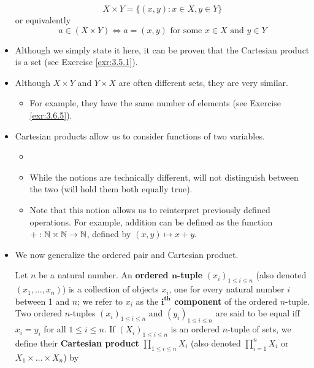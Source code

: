 \documentclass[../main.tex]{subfiles}
\begin{document}
\begin{itemize}
\begin{dfn}
\begin{equation*}
            X\times Y = \{(x,y):x\in X,y\in Y\}
        \end{equation*}
        or equivalently
        \begin{equation*}
            a\in(X\times Y) \Longleftrightarrow a=(x,y)\text{ for some }x\in X\text{ and }y\in Y
        \end{equation*}
    \end{dfn}
    \item Although we simply state it here, it can be proven that the Cartesian product is a set (see Exercise \ref{exr:3.5.1}).
    \item Although $X\times Y$ and $Y\times X$ are often different sets, they are very similar.
    \begin{itemize}
        \item For example, they have the same number of elements (see Exercise \ref{exr:3.6.5}).
    \end{itemize}
    \item Cartesian products allow us to consider functions of two variables.
    \begin{itemize}
        \item {}
        \item While the notions are technically different, \cite{bib:AnalysisI} will not distinguish between the two (will hold them both equally true).
        \item Note that this notion allows us to reinterpret previously defined operations. For example, addition can be defined as the function $+:\mathbb{N}\times\mathbb{N}\to\mathbb{N}$, defined by $(x,y)\mapsto x+y$.
    \end{itemize}
    \item We now generalize the ordered pair and Cartesian product.
    \begin{dfn}\label{dfn:nTuple}
        Let $n$ be a natural number. An \textbf{ordered $\bm{n}$-tuple} $(x_i)_{1\leq i\leq n}$ (also denoted $(x_1,\dots,x_n)$) is a collection of objects $x_i$, one for every natural number $i$ between 1 and $n$; we refer to $x_i$ as the \textbf{$\bm{i^\text{th}}$ component} of the ordered $n$-tuple. Two ordered $n$-tuples $(x_i)_{1\leq i\leq n}$ and $(y_i)_{1\leq i\leq n}$ are said to be equal iff $x_i=y_i$ for all $1\leq i\leq n$. If $(X_i)_{1\leq i\leq n}$ is an ordered $n$-tuple of sets, we define their \textbf{Cartesian product} $\prod_{1\leq i\leq n}X_i$ (also denoted $\prod_{i=1}^nX_i$ or $X_1\times\dots\times X_n$) by

\end{dfn}
\end{itemize}
\end{document}
